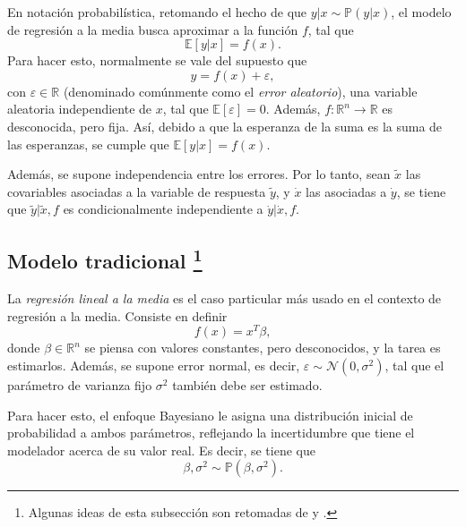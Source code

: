 En notaci\'on probabil\'istica, retomando el hecho de que $y|x \sim \mathbb{P}(y|x)$, el modelo de regresi\'on a la media busca aproximar a la funci\'on $f$, tal que 
\begin{equation*}
    \mathbb{E}[y|x] = f(x).
\end{equation*}
Para hacer esto, normalmente se vale del supuesto que
\begin{equation*}
    y = f(x) + \varepsilon,
\end{equation*}
con $\varepsilon \in \mathbb{R}$ (denominado com\'unmente como el \textit{error aleatorio}), una variable aleatoria independiente de $x$, tal que $\mathbb{E}[\varepsilon] = 0$. Adem\'as, $f: \mathbb{R}^n \rightarrow \mathbb{R}$ es desconocida, pero fija. As\'i, debido a que la esperanza de la suma es la suma de las esperanzas, se cumple que $\mathbb{E}[y|x] = f(x)$.

Adem\'as, se supone independencia entre los errores. Por lo tanto, sean $\tilde{x}$ las covariables asociadas a la variable de respuesta $\tilde{y}$, y $\dot{x}$ las asociadas a $\dot{y}$, se tiene que $\tilde{y} | \tilde{x}, f$ es condicionalmente independiente a $\dot{y} | \dot{x}, f$.

\subsection[Modelo tradicional]{
    Modelo tradicional
    \footnote{Algunas ideas de esta subsecci\'on son retomadas de \cite{Denison_BayesMethods} y \cite{Bannerjee_BayLinMod}.}
} \label{trad_mean_reg}

La \textit{regresi\'on lineal a la media} es el caso particular m\'as usado en el contexto de regresi\'on a la media. Consiste en definir
\begin{equation*}
    f(x) = x^T\beta,
\end{equation*}
donde $\beta \in \mathbb{R}^n$ se piensa con valores constantes, pero desconocidos, y la tarea es estimarlos. Adem\'as, se supone error normal, es decir, $\varepsilon \sim \mathcal{N}(0,\sigma^2)$, tal que el par\'ametro de varianza fijo $\sigma^2$ tambi\'en debe ser estimado.

Para hacer esto, el enfoque Bayesiano le asigna una distribución inicial de probabilidad a ambos par\'ametros, reflejando la incertidumbre que tiene el modelador acerca de su valor real. Es decir, se tiene que 
\begin{equation*}
    \beta,\sigma^2 \sim \mathbb{P}(\beta,\sigma^2).
\end{equation*}

